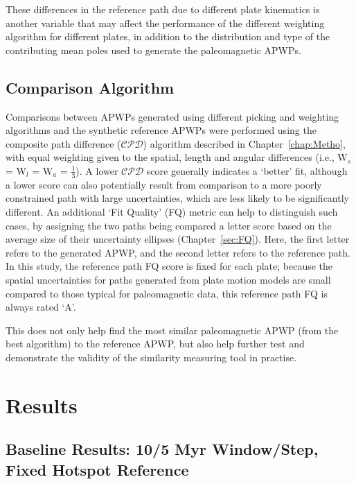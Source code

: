 These differences in the reference path due to different plate kinematics is
another variable that may affect the performance of the different weighting
algorithm for different plates, in addition to the distribution and type of the
contributing mean poles used to generate the paleomagnetic APWPs.

\subsection{Comparison Algorithm}

Comparisons between APWPs generated using different picking and weighting
algorithms and the synthetic reference APWPs were performed using the composite
path difference ($\mathcal{CPD}$) algorithm described in
Chapter~\ref{chap:Metho}, with equal weighting given to the spatial, length and
angular differences (i.e., W$_s$ = W$_l$ = W$_a$ = $\frac{1}{3}$). A lower
$\mathcal{CPD}$ score generally indicates a `better' fit, although a lower score
can also potentially result from comparison to a more poorly constrained path
with large uncertainties, which are less likely to be significantly different.
An additional `Fit Quality' (FQ) metric can help to distinguish such cases, by
assigning the two paths being compared a letter score based on the average size
of their uncertainty ellipses (Chapter~\ref{sec:FQ}). Here, the first letter
refers to the generated APWP, and the second letter refers to the reference
path. In this study, the reference path FQ score is fixed for each plate;
because the spatial uncertainties for paths generated from plate motion models
are small compared to those typical for paleomagnetic data, this reference path
FQ is always rated `A'.

This does not only help find the most similar paleomagnetic APWP (from the best
algorithm) to the reference APWP, but also help further test and demonstrate the
validity of the similarity measuring tool in practise.

\section{Results}

\subsection{Baseline Results: 10/5 Myr Window/Step, Fixed Hotspot
Reference}\label{sec:base}

